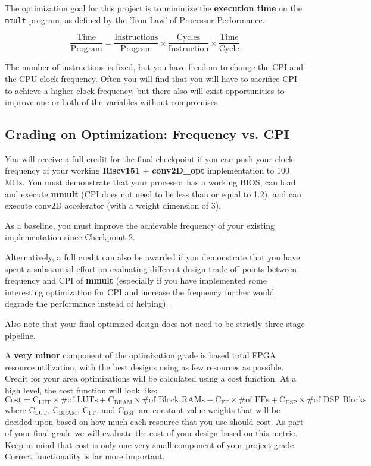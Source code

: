 \documentclass[11pt]{article}
\begin{document}
The optimization goal for this project is to minimize the \textbf{execution time} on the \verb|mmult| program, as defined by the 'Iron Law' of Processor Performance.

\begin{equation*}
\frac{\text{Time}}{\text{Program}} = \frac{\text{Instructions}}{\text{Program}} \times \frac{\text{Cycles}}{\text{Instruction}} \times \frac{\text{Time}}{\text{Cycle}}
\end{equation*}

The number of instructions is fixed, but you have freedom to change the CPI and the CPU clock frequency.
Often you will find that you will have to sacrifice CPI to achieve a higher clock frequency, but there also will exist opportunities to improve one or both of the variables without compromises.

\subsection{Grading on Optimization: Frequency vs. CPI}
You will receive a full credit for the final checkpoint if you can push your clock frequency of your working \textbf{Riscv151} + \textbf{conv2D\_opt} implementation to 100 MHz. You must demonstrate that your processor has a working BIOS, can load and execute \textbf{mmult} (CPI does not need to be less than or equal to 1.2), and can execute conv2D accelerator (with a weight dimension of 3).

As a baseline, you must improve the achievable frequency of your existing implementation since Checkpoint 2.

Alternatively, a full credit can also be awarded if you demonstrate that you have spent a substantial effort on evaluating different design trade-off points between frequency and CPI of \textbf{mmult} (especially if you have implemented some interesting optimization for CPI and increase the frequency further would degrade the performance instead of helping).

Also note that your final optimized design does not need to be strictly three-stage pipeline.

A \textbf{very minor} component of the optimization grade is based total FPGA resource utilization, with the best designs using as few resources as possible.
Credit for your area optimizations will be calculated using a cost function.
At a high level, the cost function will look like:
\begin{equation*}
\mathrm{Cost}=\mathrm{C_{LUT}} \times \text{\# of LUTs} + \mathrm{C_{BRAM}} \times \text{\# of Block RAMs} + \mathrm{C_{FF}} \times \text{\# of FFs} + \mathrm{C_{DSP}} \times \text{\# of DSP Blocks}
\end{equation*}
where $\mathrm{C_{LUT}}$, $\mathrm{C_{BRAM}}$, $\mathrm{C_{FF}}$, and $\mathrm{C_{DSP}}$ are constant value weights that will be decided upon based on how much each resource that you use should cost. As part of your final grade we will evaluate the cost of your design based on this metric. Keep in mind that cost is only one very small component of your project grade. Correct functionality is far more important.
\end{document}
